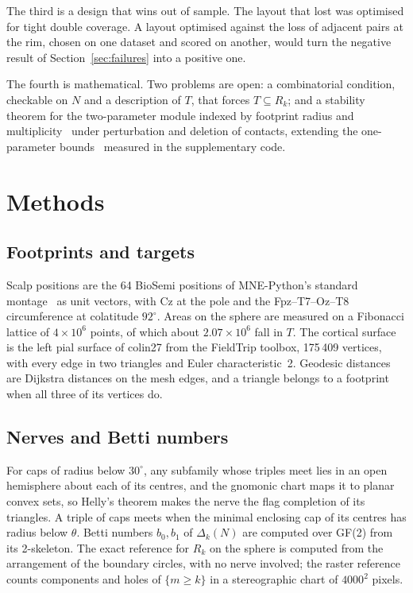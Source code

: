 \documentclass[11pt]{amsart}
\theoremstyle{definition}
\theoremstyle{remark}
\begin{document}
The third is a design that wins out of sample. The layout that lost was
optimised for tight double coverage. A layout optimised against the loss of
adjacent pairs at the rim, chosen on one dataset and scored on another, would
turn the negative result of Section~\ref{sec:failures} into a positive one.

The fourth is mathematical. Two problems are open: a combinatorial
condition, checkable on $N$ and a description of $T$, that forces
$T\subseteq R_k$; and a stability theorem for
the two-parameter module indexed by footprint radius and
multiplicity~\cite{CarlssonZomorodian2009} under perturbation and deletion of
contacts, extending the one-parameter bounds~\cite{CohenSteiner2007} measured
in the supplementary code.


\section{Methods}\label{sec:methods}

\subsection*{Footprints and targets}
Scalp positions are the 64 BioSemi positions of MNE-Python's standard
montage~\cite{Gramfort2013} as unit vectors, with Cz at the pole and the
Fpz--T7--Oz--T8 circumference at colatitude $92^\circ$. Areas on the sphere are
measured on a Fibonacci lattice of $4\times10^6$ points, of which about
$2.07\times10^6$ fall in $T$. The cortical surface is the left pial surface of
colin27 from the FieldTrip toolbox, 175\,409 vertices, with every edge in two
triangles and Euler characteristic~2. Geodesic distances are Dijkstra
distances on the mesh edges, and a triangle belongs to a footprint when all
three of its vertices do.

\subsection*{Nerves and Betti numbers}
For caps of radius below $30^\circ$, any subfamily whose triples meet lies in
an open hemisphere about each of its centres, and the gnomonic chart maps it to
planar convex sets, so Helly's theorem makes the nerve the flag completion of
its triangles. A triple of caps meets when the minimal enclosing cap of its
centres has radius below $\theta$. Betti numbers $b_0,b_1$ of $\Delta_k(N)$
are computed over GF(2) from its 2-skeleton. The exact reference for $R_k$ on
the sphere is computed from the arrangement of the boundary circles, with no
nerve involved; the raster reference counts components and holes of
$\{m\ge k\}$ in a stereographic chart of $4000^2$ pixels.
\end{document}
